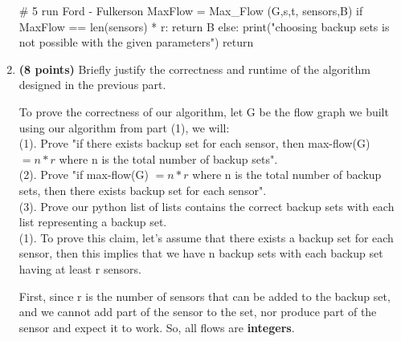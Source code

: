 \documentclass{assignment-373}
\begin{document}
\begin{enumerate}
\begin{python}
    # 5 run Ford - Fulkerson
    MaxFlow = Max_Flow (G,s,t, sensors,B)
    if MaxFlow == len(sensors) * r:
        return B
    else:
        print("choosing backup sets is not 
        possible with the given parameters")
    return
    \end{python}

\item \textbf{(8 points)} Briefly justify the correctness and runtime of the algorithm designed in the previous part.

 \phantom{=} \phantom{=} To prove the correctness of our algorithm, let G be the flow graph we built using our algorithm from part (1), we will:\\
       \phantom{=} \phantom{=}  (1). Prove "if there exists backup set for each sensor, then max-flow(G) $= n*r$ where n is the total number of backup sets".\\
        \phantom{=} \phantom{=} (2). Prove "if max-flow(G) $= n*r$ where n is the total number of backup sets, then there exists backup set for each sensor".\\
         \phantom{=} \phantom{=} (3). Prove our python list of lists contains the correct backup sets with each list representing a backup set.\\
        
    (1). To prove this claim, let's assume that there exists a backup set for each sensor, then this implies that we have n backup sets with each backup set having at least r sensors.
    
    \phantom{=} \phantom{=} First, since r is the number of sensors that can be added to the backup set, and we cannot add part of the sensor to the set, nor produce part of the sensor and expect it to work. So, all flows are \textbf{integers}.
    

\end{enumerate}
\end{document}
